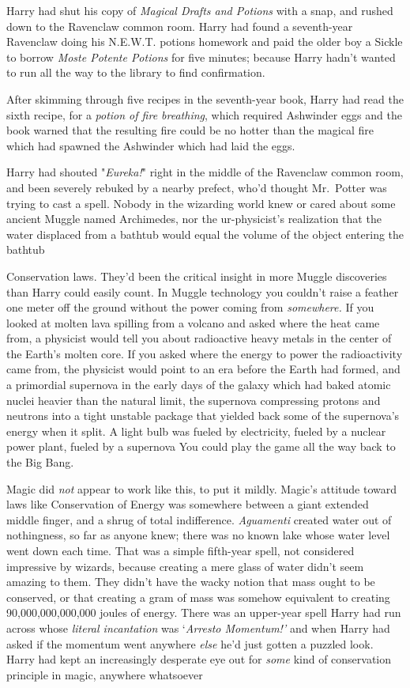 Harry had shut his copy of \emph{Magical Drafts and Potions} with a snap, and
rushed down to the Ravenclaw common room. Harry had found a seventh-year
Ravenclaw doing his N.E.W.T. potions homework and paid the older boy a Sickle
to borrow \emph{Moste Potente Potions} for five minutes; because Harry hadn't
wanted to run all the way to the library to find confirmation.

After skimming through five recipes in the seventh-year book, Harry had read
the sixth recipe, for a \emph{potion of fire breathing}, which required
Ashwinder eggs{\el} and the book warned that the resulting fire could be no
hotter than the magical fire which had spawned the Ashwinder which had laid the
eggs.

Harry had shouted "\emph{Eureka!}" right in the middle of the Ravenclaw common
room, and been severely rebuked by a nearby prefect, who'd thought Mr.~Potter
was trying to cast a spell. Nobody in the wizarding world knew or cared about
some ancient Muggle named Archimedes, nor the ur-physicist's realization that
the water displaced from a bathtub would equal the volume of the object
entering the bathtub{\el}

Conservation laws. They'd been the critical insight in more Muggle discoveries
than Harry could easily count. In Muggle technology you couldn't raise a
feather one meter off the ground without the power coming from
\emph{somewhere.} If you looked at molten lava spilling from a volcano and
asked where the heat came from, a physicist would tell you about radioactive
heavy metals in the center of the Earth's molten core. If you asked where the
energy to power the radioactivity came from, the physicist would point to an
era before the Earth had formed, and a primordial supernova in the early days
of the galaxy which had baked atomic nuclei heavier than the natural limit, the
supernova compressing protons and neutrons into a tight unstable package that
yielded back some of the supernova's energy when it split. A light bulb was
fueled by electricity, fueled by a nuclear power plant, fueled by a
supernova{\el} You could play the game all the way back to the Big Bang.

Magic did \emph{not} appear to work like this, to put it mildly. Magic's
attitude toward laws like Conservation of Energy was somewhere between a giant
extended middle finger, and a shrug of total indifference. \emph{Aguamenti}
created water out of nothingness, so far as anyone knew; there was no known
lake whose water level went down each time. That was a simple fifth-year spell,
not considered impressive by wizards, because creating a mere glass of water
didn't seem amazing to them. They didn't have the wacky notion that mass ought
to be conserved, or that creating a gram of mass was somehow equivalent to
creating 90,000,000,000,000 joules of energy. There was an upper-year spell
Harry had run across whose \emph{literal incantation} was `\emph{Arresto
Momentum!'} and when Harry had asked if the momentum went anywhere \emph{else}
he'd just gotten a puzzled look. Harry had kept an increasingly desperate eye
out for \emph{some} kind of conservation principle in magic, anywhere
whatsoever{\el}

